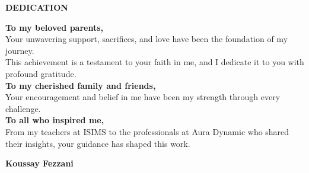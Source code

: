 \clearpage
\vspace*{0.15\textheight}
\begin{center}
    {\Huge \bfseries DEDICATION} \\[3em]
\end{center}

\begin{flushleft}
    \textbf{To my beloved parents,}\\
    Your unwavering support, sacrifices, and love have been the foundation of my journey.\\
    This achievement is a testament to your faith in me, and I dedicate it to you with profound gratitude.\\[1.5em]

    \textbf{To my cherished family and friends,}\\
    Your encouragement and belief in me have been my strength through every challenge.\\[1.5em]

    \textbf{To all who inspired me,}\\
    From my teachers at ISIMS to the professionals at Aura Dynamic who shared their insights, your guidance has shaped this work.\\[3em]
\end{flushleft}

\begin{flushright}
    \textbf{Koussay Fezzani}
\end{flushright}
\newpage
